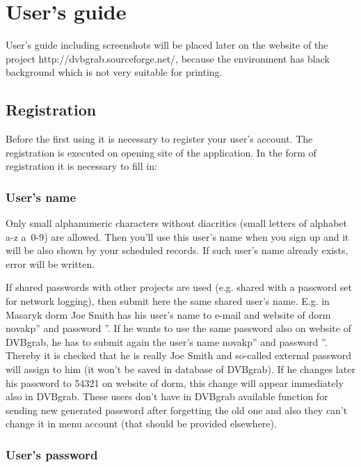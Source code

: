 \chapter{User's guide}

User's guide including screenshots will be placed later on the website of the project \linebreak[4] http://dvbgrab.sourceforge.net/, because the environment has black background which is not very suitable for printing.

\section{Registration}

Before the first using it is necessary to register your user's account. The registration is executed on opening site of the application. In the form of registration it is necessary to fill in:

\subsection{User's name}

Only small alphanumeric characters without diacritics (small letters of alphabet a-z a~0-9) are allowed. Then you'll use this user's name when you sign up and it will be also shown by your scheduled records. If such user's name already exists, error will be written. 

If shared passwords with other projects are used (e.g. shared with a password set for network logging), then submit here the same shared user's name. E.g. in Masaryk dorm Joe Smith has his user's name to e-mail and website of dorm \quotedblbase novakp'' and password ''. If he wants to use the same password also on website of DVBgrab, he has to submit again the user's name \quotedblbase novakp'' and password ''. Thereby it is checked that he is really Joe Smith and so-called external password will assign to him (it won't be saved in database of DVBgrab). If he changes later his password to 54321 on website of dorm, this change will appear immediately also in DVBgrab. These users don't have in DVBgrab available function for sending new generated password after forgetting the old one and also they can't change it in menu account (that should be provided elsewhere).

\subsection{User's password}

